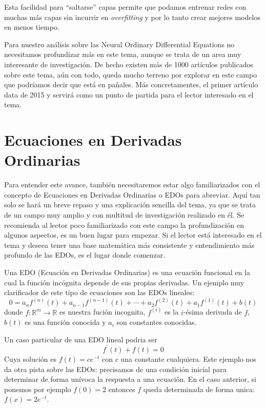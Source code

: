 \documentclass[12pt]{report}
\begin{document}
Esta facilidad para ``saltarse'' capas permite que podamos entrenar redes con
muchas más capas sin incurrir en \textit{overfitting} y por lo tanto crear
mejores modelos en menos tiempo.

Para nuestro análisis sobre las Neural Ordinary Differential Equations no
necesitamos profundizar más en este tema, aunque se trata de un area muy
interesante de investigación. De hecho existen más de 1000 artículos publicados
sobre este tema, aún con todo, queda mucho terreno por explorar en este campo
que podríamos decir que está en pañales. Más concretamentes, el primer artículo
\cite{micro15} data de 2015 y servirá como un punto de partida para el lector
interesado en el tema.


\section{Ecuaciones en Derivadas Ordinarias}

Para entender este avance, también necesitaremos estar algo familiarizados con
el concepto de Ecuaciones en Derivadas Ordinarias o EDOs para abreviar. Aquí tan
solo se hará un breve repaso y una explicación sencilla del tema, ya que se
trata de un campo muy amplio y con multitud de investigación realizado en él. Se
recomienda al lector poco familiarizado con este campo la profundización en
algunos aspectos, \cite{wode} es un buen lugar para empezar. Si el lector está
interesado en el tema y deseea tener una base matemática más consistente y
entendimiento más profundo de las EDOs, \cite{brown19} es el lugar donde
comenzar.

Una EDO (Ecuación en Derivadas Ordinarias) es una ecuación funcional
\cite{wfe} en la cual la función incógnita depende de sus propias derivadas. Un
ejemplo muy clarificador de este tipo de ecuaciones son las EDOs lineales:
\[
    0 = a_n f^{(n)}(t) + a_{n-1} f^{(n-1)}(t) + \cdots + a_2 f^{(2)}(t) +
    a_1 f^{(1)}(t) + b(t)
\]
donde $f \colon \mathbb{R}^m \to \mathbb{R}$ es nuestra fución incognita,
$f^{(i)}$ es la $i$-ésima derivada de $f$, $b(t)$ es una función conocida y
$a_i$ son constantes conocidas.

Un caso particular de una EDO lineal podria ser
\[
    f^\prime(t) + f(t) = 0
\]
Cuya solución es $f(t) = c e^{-t}$ con $c$ una constante cualquiera. Este
ejemplo nos da otra pista sobre las EDOs: precisamos de una condición inicial
para determinar de forma unívoca la respuesta a una ecuación. En el caso
anterior, si ponemos por ejemplo $f(0) = 2$ entonces $f$ queda determinada de
forma unica: $f(x) = 2 e^{-t}$.
\end{document}
